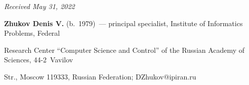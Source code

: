 \vspace*{-6pt}



\hfill{\small\textit{Received May 31, 2022}} 






\Contrl



\noindent

\textbf{Zhukov Denis V.} (b.\ 1979)~--- principal specialist, Institute of Informatics Problems, Federal 

Research Center ``Computer Science and Control'' of the Russian Academy of Sciences, 44-2~Vavilov 

Str., Moscow 119333, Russian Federation; \mbox{DZhukov@ipiran.ru}



\label{end\stat}



\renewcommand{\bibname}{\protect\rm Литература} 

